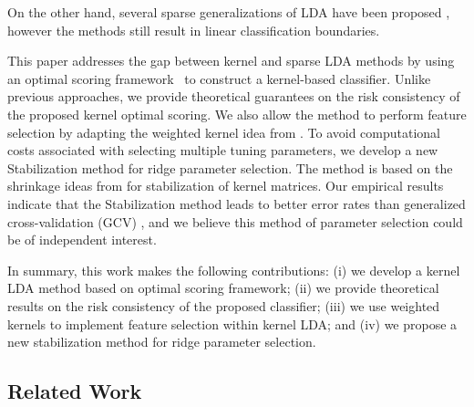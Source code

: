\documentclass[twoside, onecolumn]{article}
\begin{document}

On the other hand, several sparse generalizations of LDA have been proposed \cite{Cai:2011dm,Clemmensen:2011kr,Gaynanova:2016wk}, however the methods still result in linear classification boundaries.

This paper addresses the gap between kernel and sparse LDA methods by using an optimal scoring framework~\cite{Hastie:1994cx} to construct a kernel-based classifier. Unlike previous approaches, we provide theoretical guarantees on the risk consistency of the proposed kernel optimal scoring. We also allow the method to perform feature selection by adapting the weighted kernel idea from \cite{allen_automatic_2013}. To avoid computational costs associated with selecting multiple tuning parameters, we develop a new  Stabilization method for ridge parameter selection. The method is based on the shrinkage ideas from \cite{lancewicki_regularization_2017} for stabilization of kernel matrices. Our empirical results indicate that the Stabilization method leads to better error rates than generalized cross-validation (GCV) \cite{Craven1978,  golub1979generalized,xiang1996generalized}, and we believe this method of parameter selection could be of independent interest.


In summary, this work makes the following contributions: (i) we develop a kernel LDA method based on optimal scoring framework; (ii) we provide theoretical results on the risk consistency of the proposed classifier; (iii) we use weighted kernels to implement feature selection within kernel LDA; and (iv) we propose a new stabilization method for ridge parameter selection.

\subsection{Related Work}
\end{document}
